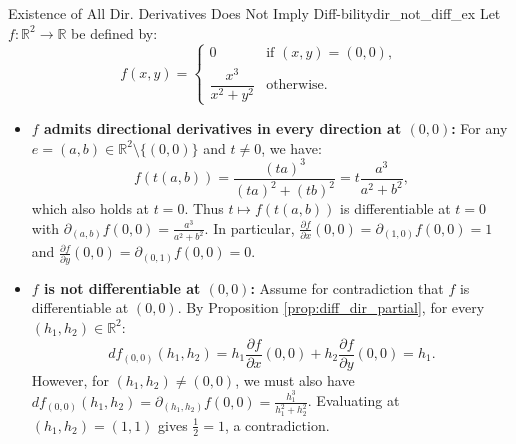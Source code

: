 \documentclass[11pt, a4paper]{article}
\newcommand{\R}{\mathbb{R}}
\begin{document}
\begin{example}{Existence of All Dir. Derivatives Does Not Imply Diff-bility}{dir_not_diff_ex}
Let $f: \R^2 \to \R$ be defined by:
\[
f(x, y) = \begin{cases}
0 & \text{if } (x, y) = (0, 0), \\
\dfrac{x^3}{x^2 + y^2} & \text{otherwise.}
\end{cases}
\]
\begin{itemize}
    \item \textbf{$f$ admits directional derivatives in every direction at $(0, 0)$:} For any $e = (a, b) \in \R^2 \setminus \{(0, 0)\}$ and $t \neq 0$, we have:
    \[
    f(t(a, b)) = \frac{(ta)^3}{(ta)^2 + (tb)^2} = t \frac{a^3}{a^2 + b^2},
    \]
    which also holds at $t = 0$. Thus $t \mapsto f(t(a, b))$ is differentiable at $t = 0$ with $\partial_{(a, b)} f(0, 0) = \frac{a^3}{a^2 + b^2}$. In particular, $\frac{\partial f}{\partial x}(0, 0) = \partial_{(1, 0)} f(0, 0) = 1$ and $\frac{\partial f}{\partial y}(0, 0) = \partial_{(0, 1)} f(0, 0) = 0$.
    \item \textbf{$f$ is not differentiable at $(0, 0)$:} Assume for contradiction that $f$ is differentiable at $(0, 0)$. By Proposition \ref{prop:diff_dir_partial}, for every $(h_1, h_2) \in \R^2$:
    \[
    df_{(0, 0)}(h_1, h_2) = h_1 \frac{\partial f}{\partial x}(0, 0) + h_2 \frac{\partial f}{\partial y}(0, 0) = h_1.
    \]
    However, for $(h_1, h_2) \neq (0, 0)$, we must also have $df_{(0, 0)}(h_1, h_2) = \partial_{(h_1, h_2)} f(0, 0) = \frac{h_1^3}{h_1^2 + h_2^2}$. Evaluating at $(h_1, h_2) = (1, 1)$ gives $\frac{1}{2} = 1$, a contradiction.
\end{itemize}
\end{example}
\end{document}
